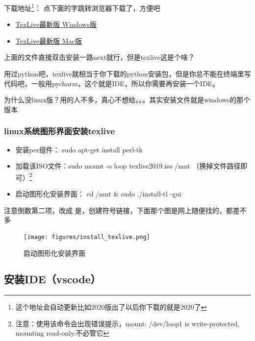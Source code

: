 \documentclass[AutoFakeBold]{LZUThesis2007}
\begin{document}
下载地址\footnote{这个地址会自动更新比如2020版出了以后你下载的就是2020了}： 点下面的字跳转浏览器下载了，方便吧

\begin{itemize}
	\item \href{https://mirrors.tuna.tsinghua.edu.cn/CTAN/systems/texlive/Images/texlive.iso}{TexLive最新版 \quad Windows版}
	\item \href{http://tug.org/cgi-bin/mactex-download/MacTeX.pkg}{TexLive最新版 \quad Mac版}
\end{itemize}

上面的文件直接双击安装一路next就行，但是texlive这是个啥？

用过python吧，texlive就相当于你下载的python安装包，但是你总不能在终端里写代码吧，一般用pycharm，这个就是IDE，所以你需要再安装一个IDE。


为什么没linux版？用的人不多，真心不想给。。。其实安装文件就是windows的那个版本

\subsubsection{linux系统图形界面安装texlive} %
\label{ssub:linux图形界面安装方式}

\begin{itemize}
	\item[1. ] 安装per组件： sudo apt-get install perl-tk
	\item[2. ] 加载该ISO文件：sudo mount -o loop texlive2019.iso /mnt （换掉文件路径即可）\footnote{注意：使用该命令会出现错误提示，mount: /dev/loop1 is write-protected, mounting read-only.不必管它}
	\item[3. ]启动图形化安装界面： cd /mnt \& sudo ./install-tl -gui
\end{itemize}

注意倒数第二项，改成 是，创建符号链接，下面那个图是网上随便找的，都差不多

\begin{figure}[H]
    \centering
    \texttt{[image: figures/install\_texlive.png]}
    \caption{启动图形化安装界面}
    \label{fig_install_texlive}
\end{figure}





\subsection{安装IDE（vscode）} %
\label{sub:安装ide}
\end{document}
